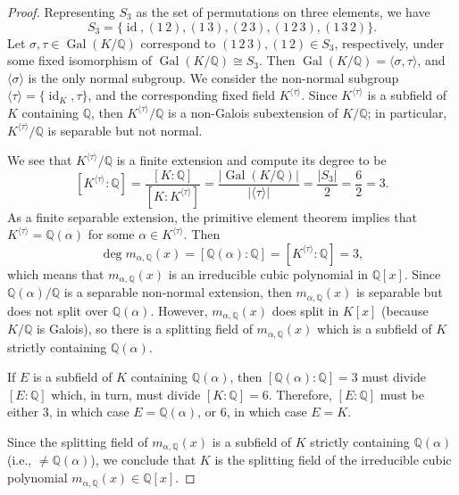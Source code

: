 \documentclass[12pt]{article}
\theoremstyle{definition}
\newcommand{\Q}{\mathbb{Q}}
\newcommand{\<}{\langle}
\renewcommand{\>}{\rangle}
\newcommand{\isom}{\cong}
\DeclareMathOperator{\id}{id}
\DeclareMathOperator{\Gal}{Gal}
\begin{document}
\begin{proof}
    Representing $S_3$ as the set of permutations on three elements, we have
    \[
        S_3 = \{\id, (1\,2), (1\,3), (2\,3), (1\,2\,3), (1\,3\,2)\}.
    \]
    Let $\sigma, \tau \in \Gal(K/\Q)$ correspond to $(1\,2\,3), (1\,2) \in S_3$, respectively, under some fixed isomorphism of $\Gal(K/\Q) \isom S_3$. Then $\Gal(K/\Q) = \<\sigma, \tau\>$, and $\<\sigma\>$ is the only normal subgroup. We consider the non-normal subgroup $\<\tau\> = \{\id_K, \tau\}$, and the corresponding fixed field $K^{\<\tau\>}$. Since $K^{\<\tau\>}$ is a subfield of $K$ containing $\Q$, then $K^{\<\tau\>}/\Q$ is a non-Galois subextension of $K/\Q$; in particular, $K^{\<\tau\>}/\Q$ is separable but not normal.

    We see that $K^{\<\tau\>}/\Q$ is a finite extension and compute its degree to be 
    \[
        [K^{\<\tau\>} : \Q]
            = \frac{[K : \Q]}{[K : K^{\<\tau\>}]}
            = \frac{|\Gal(K/\Q)|}{|\<\tau\>|}
            = \frac{|S_3|}{2}
            = \frac{6}{2}
            = 3.
    \]
    As a finite separable extension, the primitive element theorem implies that $K^{\<\tau\>} = \Q(\alpha)$ for some $\alpha \in K^{\<\tau\>}$. Then
    \[
        \deg m_{\alpha, \Q}(x) = [\Q(\alpha) : \Q] = [K^{\<\tau\>} : \Q] = 3,
    \]
    which means that $m_{\alpha, \Q}(x)$ is an irreducible cubic polynomial in $\Q[x]$. Since $\Q(\alpha)/\Q$ is a separable non-normal extension, then $m_{\alpha, \Q}(x)$ is separable but does not split over $\Q(\alpha)$. However,  $m_{\alpha, \Q}(x)$ does split in $K[x]$ (because $K/\Q$ is Galois), so there is a splitting field of $m_{\alpha, \Q}(x)$ which is a subfield of $K$ strictly containing $\Q(\alpha)$.
    
    If $E$ is a subfield of $K$ containing $\Q(\alpha)$, then $[\Q(\alpha) : \Q] = 3$ must divide $[E : \Q]$ which, in turn, must divide $[K : \Q] = 6$. Therefore, $[E : \Q]$ must be either $3$, in which case $E = \Q(\alpha)$, or $6$, in which case $E = K$.

    Since the splitting field of $m_{\alpha, \Q}(x)$ is a subfield of $K$ strictly containing $\Q(\alpha)$ (i.e., $\ne \Q(\alpha)$), we conclude that $K$ is the splitting field of the irreducible cubic polynomial $m_{\alpha, \Q}(x) \in \Q[x]$.

\end{proof}
\end{document}
